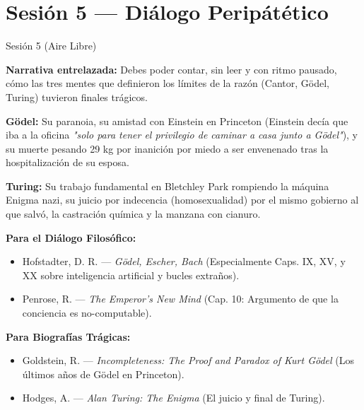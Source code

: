 \documentclass[11pt, letterpaper]{article}
\begin{document}
\newpage

\section{Sesi\'on 5 --- Di\'alogo Perip\'at\'etico}

\begin{historia}{Sesi\'on 5 (Aire Libre)}
\begin{checklist}
  \item \textbf{Narrativa entrelazada:} Debes poder contar, sin leer y con ritmo pausado, c\'omo las tres mentes que definieron los l\'imites de la raz\'on (Cantor, G\"odel, Turing) tuvieron finales tr\'agicos.
  \item \textbf{G\"odel:} Su paranoia, su amistad con Einstein en Princeton (Einstein dec\'ia que iba a la oficina \textit{"solo para tener el privilegio de caminar a casa junto a G\"odel"}), y su muerte pesando 29 kg por inanici\'on por miedo a ser envenenado tras la hospitalizaci\'on de su esposa.
  \item \textbf{Turing:} Su trabajo fundamental en Bletchley Park rompiendo la m\'aquina Enigma nazi, su juicio por indecencia (homosexualidad) por el mismo gobierno al que salv\'o, la castraci\'on qu\'imica y la manzana con cianuro.
\end{checklist}
\end{historia}

\begin{referencias}
\textbf{Para el Di\'alogo Filos\'ofico:}
\begin{itemize}
    \item Hofstadter, D. R. --- \textit{G\"odel, Escher, Bach} (Especialmente Caps. IX, XV, y XX sobre inteligencia artificial y bucles extra\~nos).
    \item Penrose, R. --- \textit{The Emperor's New Mind} (Cap. 10: Argumento de que la conciencia es no-computable).
\end{itemize}
\textbf{Para Biograf\'ias Tr\'agicas:}
\begin{itemize}
    \item Goldstein, R. --- \textit{Incompleteness: The Proof and Paradox of Kurt G\"odel} (Los \'ultimos a\~nos de G\"odel en Princeton).
    \item Hodges, A. --- \textit{Alan Turing: The Enigma} (El juicio y final de Turing).
\end{itemize}
\end{referencias}
\end{document}
